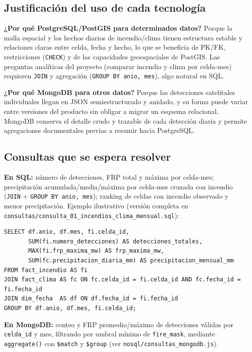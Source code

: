 \documentclass[11pt,a4paper]{article}
\begin{document}
\subsection{Justificaci\'on del uso de cada tecnolog\'ia}

\textbf{¿Por qu\'e PostgreSQL/PostGIS para determinados datos?} Porque la malla espacial y los hechos diarios de incendio/clima tienen estructura estable y relaciones claras entre celda, fecha y hecho, lo que se beneficia de PK/FK, restricciones (\texttt{CHECK}) y de las capacidades geoespaciales de PostGIS. Las preguntas anal\'iticas del proyecto (comparar incendio y clima por celda-mes) requieren \texttt{JOIN} y agregaci\'on (\texttt{GROUP BY anio, mes}), algo natural en SQL.

\textbf{¿Por qu\'e MongoDB para otros datos?} Porque las detecciones satelitales individuales llegan en JSON semiestructurado y anidado, y su forma puede variar entre versiones del producto sin obligar a migrar un esquema relacional. MongoDB conserva el detalle crudo y trazable de cada detecci\'on diaria y permite agregaciones documentales previas a resumir hacia PostgreSQL.

\subsection{Consultas que se espera resolver}
\textbf{En SQL:} n\'umero de detecciones, FRP total y m\'axima por celda-mes; precipitaci\'on acumulada/media/m\'axima por celda-mes cruzada con incendio (\texttt{JOIN} + \texttt{GROUP BY anio, mes}); ranking de celdas con incendio observado y menor precipitaci\'on. Ejemplo ilustrativo (versi\'on completa en \texttt{consultas/consulta\_01\_incendios\_clima\_mensual.sql}):

\begin{footnotesize}
\begin{verbatim}
SELECT df.anio, df.mes, fi.celda_id,
       SUM(fi.numero_detecciones) AS detecciones_totales,
       MAX(fi.frp_maxima_mw) AS frp_maxima_mw,
       SUM(fc.precipitacion_diaria_mm) AS precipitacion_mensual_mm
FROM fact_incendio AS fi
JOIN fact_clima AS fc ON fc.celda_id = fi.celda_id AND fc.fecha_id = fi.fecha_id
JOIN dim_fecha  AS df ON df.fecha_id = fi.fecha_id
GROUP BY df.anio, df.mes, fi.celda_id;
\end{verbatim}
\end{footnotesize}

\textbf{En MongoDB:} conteo y FRP promedio/m\'aximo de detecciones v\'alidas por \texttt{celda\_id} y mes, filtrando por umbral m\'inimo de \texttt{fire\_mask}, mediante \texttt{aggregate()} con \texttt{\$match} y \texttt{\$group} (ver \texttt{nosql/consultas\_mongodb.js}).
\end{document}
